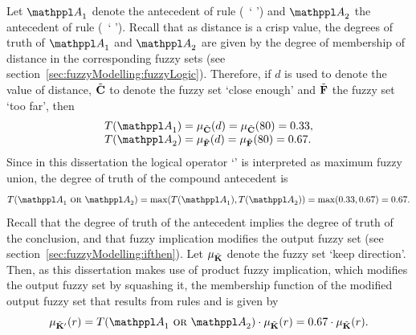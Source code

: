 Let $\statement{A}_1$ denote the antecedent of rule  (\ie\ `  ') and $\statement{A}_2$ the antecedent of rule  (\ie\ `  '). Recall that as distance is a crisp value, the degrees of truth of $\statement{A}_1$ and $\statement{A}_2$ are given by the degree of membership of distance in the corresponding fuzzy sets (see section~\ref{sec:fuzzyModelling:fuzzyLogic}). Therefore, if $d$ is used to denote the value of distance, ${\tilde{{\mathbf{C}}}}$ to denote the fuzzy set `close enough' and ${\tilde{{\mathbf{F}}}}$ the fuzzy set `too far', then
%
\begin{equation}
\begin{array}{ll}
T(\statement{A}_1)=\mu_\fset{C}(d)=\mu_\fset{C}(80)=0.33, \\
T(\statement{A}_2)=\mu_\fset{F}(d)=\mu_\fset{F}(80)=0.67.
\end{array}
\end{equation}
%
Since in this dissertation the logical operator `' is interpreted as maximum fuzzy union, the degree of truth of the compound antecedent is 
%
\begin{equation}
T(\statement{A}_1\ \kwd{or}\ \statement{A}_2)=\max(T(\statement{A}_1),T(\statement{A}_2))=\max(0.33,0.67)=0.67.
\end{equation}
%
Recall that the degree of truth of the antecedent implies the degree of truth of the conclusion, and that fuzzy implication modifies the output fuzzy set (see section~\ref{sec:fuzzyModelling:ifthen}). Let $\mu_{\tilde{{\mathbf{K}}}}$ denote the fuzzy set `keep direction'. Then, as this dissertation makes use of product fuzzy implication, which modifies the output fuzzy set by squashing it, the membership function of the modified output fuzzy set that results from rules  and  is given by
%
\begin{equation}
\mu_{\fset{K}'}(r)=T(\statement{A}_1\ \kwd{or}\ \statement{A}_2) \cdot \mu_\fset{K}(r)=0.67 \cdot \mu_\fset{K}(r).
\end{equation}

